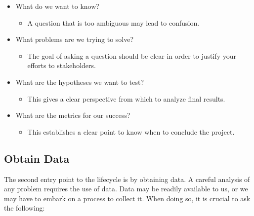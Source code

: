 \documentclass[
  letterpaper,
  DIV=11,
  numbers=noendperiod]{scrreprt}
\providecommand{\tightlist}{%
  \setlength{\itemsep}{0pt}\setlength{\parskip}{0pt}}\usepackage{longtable,booktabs,array}
\begin{document}
\begin{itemize}
\tightlist
\item
  What do we want to know?

  \begin{itemize}
  \tightlist
  \item
    A question that is too ambiguous may lead to confusion.
  \end{itemize}
\item
  What problems are we trying to solve?

  \begin{itemize}
  \tightlist
  \item
    The goal of asking a question should be clear in order to justify
    your efforts to stakeholders.
  \end{itemize}
\item
  What are the hypotheses we want to test?

  \begin{itemize}
  \tightlist
  \item
    This gives a clear perspective from which to analyze final results.
  \end{itemize}
\item
  What are the metrics for our success?

  \begin{itemize}
  \tightlist
  \item
    This establishes a clear point to know when to conclude the project.
  \end{itemize}
\end{itemize}

\hypertarget{obtain-data}{%
\subsection{Obtain Data}\label{obtain-data}}

The second entry point to the lifecycle is by obtaining data. A careful
analysis of any problem requires the use of data. Data may be readily
available to us, or we may have to embark on a process to collect it.
When doing so, it is crucial to ask the following:
\end{document}
